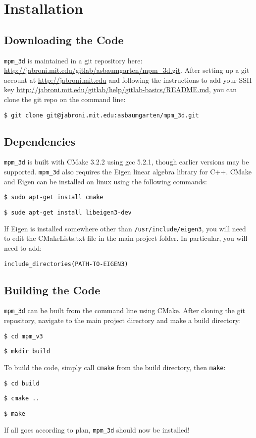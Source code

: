 \chapter{Installation}
\section{Downloading the Code}
\texttt{mpm\_3d} is maintained in a git repository here: \url{http://jabroni.mit.edu/gitlab/asbaumgarten/mpm\_3d.git}. After setting up a git account at \url{http://jabroni.mit.edu} and following the instructions to add your SSH key \url{http://jabroni.mit.edu/gitlab/help/gitlab-basics/README.md}, you can clone the git repo on the command line:

\texttt{\$ git clone git@jabroni.mit.edu:asbaumgarten/mpm\_3d.git}


\section{Dependencies}
\texttt{mpm\_3d} is built with CMake 3.2.2 using gcc 5.2.1,
though earlier versions may be supported. \texttt{mpm\_3d} also requires the Eigen linear algebra library for C++. CMake and Eigen can be installed on linux using the following commands:

\texttt{\$ sudo apt-get install cmake}

\texttt{\$ sude apt-get install libeigen3-dev}

If Eigen is installed somewhere other than \texttt{/usr/include/eigen3}, you will need to edit the CMakeLists.txt file in the main project folder. In particular, you will need to add:

\texttt{include\_directories(PATH-TO-EIGEN3)}


\section{Building the Code}
\texttt{mpm\_3d} can be built from the command line using CMake. After cloning the git repository, navigate to the main project directory and make a build directory:

\texttt{\$ cd mpm\_v3}

\texttt{\$ mkdir build}

To build the code, simply call \texttt{cmake} from the build directory, then \texttt{make}:

\texttt{\$ cd build}

\texttt{\$ cmake ..}

\texttt{\$ make}

If all goes according to plan, \texttt{mpm\_3d} should now be installed!